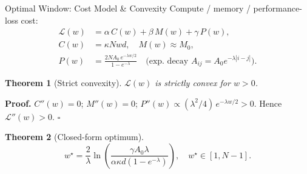 \documentclass[10pt,aspectratio=169]{beamer}
\newtheorem{thm}{Theorem}
\begin{document}
\begin{frame}{Optimal Window: Cost Model \& Convexity}
  Compute / memory / performance-loss cost:
  \begin{align*}
    \mathcal{L}(w) &= \alpha\, C(w) + \beta\, M(w) + \gamma\, P(w),\\
    C(w) &= \kappa N w d,\quad M(w) \approx M_0,\\
    P(w) &= \frac{2 N A_0\, e^{-\lambda w/2}}{1 - e^{-\lambda}}
         \quad\text{(exp.\ decay } A_{ij} = A_0 e^{-\lambda|i-j|}\text{)}.
  \end{align*}
  \begin{thm}[Strict convexity]
  $\mathcal{L}(w)$ is strictly convex for $w > 0$.
  \end{thm}
  \textbf{Proof.} $C''(w) = 0$; $M''(w) = 0$; $P''(w) \propto
  (\lambda^2/4)\,e^{-\lambda w/2} > 0$. Hence
  $\mathcal{L}''(w) > 0$. $\square$
  \vspace{1ex}

  \begin{thm}[Closed-form optimum]
    \[
      w^{\star}
      = \frac{2}{\lambda}
        \ln\!\left(\frac{\gamma A_0 \lambda}
                          {\alpha \kappa d (1 - e^{-\lambda})}\right),
      \quad
      w^{\star} \in [1, N{-}1].
    \]
  \end{thm}
\end{frame}

\end{document}
